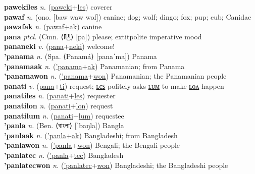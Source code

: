 \textbf{pawekiles} \textit{n.} (\hyperref[paweki]{paweki}+\hyperref[les]{les})
coverer \label{pawekiles} \\
\textbf{pawaf} \textit{n.} (ono. [baw waw wof])
canine; dog; wolf; dingo; fox; pup; cub; Canidae \label{pawaf} \\
\textbf{pawafak} \textit{n.} (\hyperref[pawaf]{pawaf}+\hyperref[ak]{ak})
canine \label{pawafak} \\
\textbf{pana} \textit{ptcl.} (Cmn. ⟨吧⟩ [pa])
please; 	extit{polite imperative mood} \label{pana} \\
\textbf{pananeki} \textit{v.} (\hyperref[pana]{pana}+\hyperref[neki]{neki})
welcome! \label{pananeki} \\
\textbf{'panama} \textit{n.} (Spa. ⟨Panamá⟩ [panaˈma])
Panama \label{'panama} \\
\textbf{'panamaak} \textit{n.} (\hyperref['panama]{'panama}+\hyperref[ak]{ak})
Panamanian; from Panama \label{'panamaak} \\
\textbf{'panamawon} \textit{n.} (\hyperref['panama]{'panama}+\hyperref[won]{won})
Panamanian; the Panamanian people \label{'panamawon} \\
\textbf{panati} \textit{v.} (\hyperref[pana]{pana}+\hyperref[ti]{ti})
request; \hyperref[panatiles]{ʟєꜱ} politely asks \hyperref[panatilum]{ʟᴜᴍ} to make \hyperref[panatilon]{ʟᴏᴧ} happen \label{panati} \\
\textbf{panatiles} \textit{n.} (\hyperref[panati]{panati}+\hyperref[les]{les})
requester \label{panatiles} \\
\textbf{panatilon} \textit{n.} (\hyperref[panati]{panati}+\hyperref[lon]{lon})
request \label{panatilon} \\
\textbf{panatilum} \textit{n.} (\hyperref[panati]{panati}+\hyperref[lum]{lum})
requestee \label{panatilum} \\
\textbf{'panla} \textit{n.} (Ben. ⟨বাংলা⟩ [ˈbaŋla])
Bangla \label{'panla} \\
\textbf{'panlaak} \textit{n.} (\hyperref['panla]{'panla}+\hyperref[ak]{ak})
Bangladeshi; from Bangladesh \label{'panlaak} \\
\textbf{'panlawon} \textit{n.} (\hyperref['panla]{'panla}+\hyperref[won]{won})
Bengali; the Bengali people \label{'panlawon} \\
\textbf{'panlatec} \textit{n.} (\hyperref['panla]{'panla}+\hyperref[tec]{tec})
Bangladesh \label{'panlatec} \\
\textbf{'panlatecwon} \textit{n.} (\hyperref['panlatec]{'panlatec}+\hyperref[won]{won})
Bangladeshi; the Bangladeshi people \label{'panlatecwon} \\
